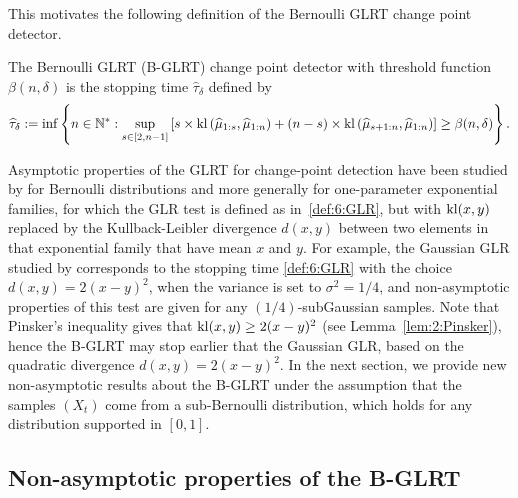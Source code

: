 This motivates the following definition of the Bernoulli GLRT change point detector.

\begin{definition}\label{def:6:GLRDef}
\begin{leftbar}[defnbar]  %
    The Bernoulli GLRT (B-GLRT) change point detector with threshold function $\beta(n,\delta)$ is the stopping time $\widehat{\tau}_{\delta}$ defined by
    \begin{equation}\label{def:6:GLR}
        \widehat{\tau}_{\delta} := \inf \left\{ n \in \mathbb{N}^* : \sup_{s \in [2,n-1]} \left[s \times \mathrm{kl}\left(\widehat{\mu}_{1:s},\widehat{\mu}_{1:n}\right) + (n-s) \times \mathrm{kl}\left(\widehat{\mu}_{s+1:n},\widehat{\mu}_{1:n}\right)\right] \geq \beta(n,\delta)\right\}.
    \end{equation}
\end{leftbar}  %
\end{definition}

Asymptotic properties of the GLRT for change-point detection have been studied by \cite{LaiXing10} for Bernoulli distributions and more generally for one-parameter exponential families, for which the GLR test is defined as in~\eqref{def:6:GLR}, but with $\mathrm{kl}(x,y)$ replaced by the Kullback-Leibler divergence $d(x,y)$ between two elements in that exponential family that have mean $x$ and $y$.
For example, the Gaussian GLR studied by \cite{Maillard2018GLR} corresponds to the stopping time \eqref{def:6:GLR} with the choice $d(x,y) = 2(x-y)^2$, when the variance is set to $\sigma^2=1/4$, and non-asymptotic properties of this test are given for any $(1/4)$-subGaussian samples.
Note that Pinsker's inequality gives that $\mathrm{kl}(x,y) \geq 2(x-y)^2$ (see Lemma~\ref{lem:2:Pinsker}), hence the B-GLRT may stop earlier that the Gaussian GLR, based on the quadratic divergence $d(x,y) = 2(x-y)^2$.
%
In the next section, we provide new non-asymptotic results about the B-GLRT under the assumption that the samples $(X_t)$ come from a sub-Bernoulli distribution, which holds for any distribution supported in $[0,1]$.


\subsection{Non-asymptotic properties of the B-GLRT}\label{subsec:6:PropGLR}

